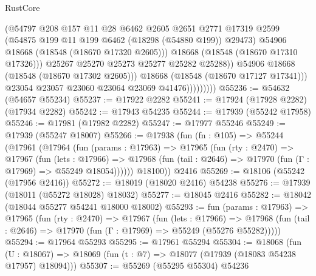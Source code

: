 \begin{lexlean}{RustCore}
\begin{coremodule}
                                (@54797
                                  @208
                                  @157
                                  @11
                                  @28
                                  @6462
                                  @2605
                                  @2651
                                  @2771
                                  @17319
                                  @2599
                                  (@54875 @199 @11 @199 @6462 (@18298 (@54880 @199)) @29473)
                                  @54906
                                  @18668
                                  (@18548 (@18670 @17320 @2605)))
                                @18668
                                (@18548 (@18670 @17310 @17326)))
                              @25267
                              @25270
                              @25273
                              @25277
                              @25282
                              @25288))
                          @54906
                          @18668
                          (@18548 (@18670 @17302 @2605)))
                        @18668
                        (@18548 (@18670 @17127 @17341)))
                      @23054
                      @23057
                      @23060
                      @23064
                      @23069
                      @41476)))))))))
@55236 := @54632 (@54657 @55234)
@55237 := @17922 @2282
@55241 := @17924 (@17928 @2282) (@17934 @2282)
@55242 := @17943 @54235
@55244 := @17939 (@55242 @17958)
@55246 := @17981 (@17982 @2282)
@55247 := @17977 @55246
@55249 := @17939 (@55247 @18007)
@55266 := @17938
    (fun (fn : @105) =>
    @55244
      (@17961
        (@17964
          (fun (params : @17963) =>
          @17965
            (fun (rty : @2470) =>
            @17967
              (fun (lets : @17966) =>
              @17968 (fun (tail : @2646) => @17970 (fun (Γ : @17969) => @55249 @18054))))))
        @18100))
    @2416
@55269 := @18106 (@55242 (@17956 @2416))
@55272 := @18019 (@18020 @2416) @54238
@55276 := @17939 (@18011 (@55272 @18028) @18032)
@55277 := @18045 @2416
@55282 := @18042 (@18044 @55277 @54241 @18000 @18002)
@55293 := fun (params : @17963) =>
  @17965
    (fun (rty : @2470) =>
    @17967
      (fun (lets : @17966) =>
      @17968 (fun (tail : @2646) => @17970 (fun (Γ : @17969) => @55249 (@55276 @55282)))))
@55294 := @17964 @55293
@55295 := @17961 @55294
@55304 := @18068
    (fun (U : @18067) => @18069 (fun (t : @7) => @18077 (@17939 (@18083 @54238 @17957) @18094)))
@55307 := @55269 (@55295 @55304) @54236

\end{coremodule}
\end{lexlean}
